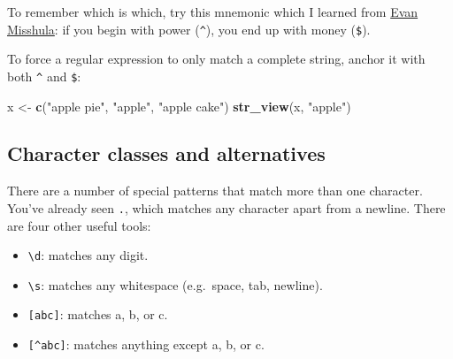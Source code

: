 \documentclass[]{book}
\newenvironment{Shaded}{\begin{snugshade}}{\end{snugshade}}
\newcommand{\KeywordTok}[1]{\textcolor[rgb]{0.13,0.29,0.53}{\textbf{#1}}}
\newcommand{\NormalTok}[1]{#1}
\newcommand{\StringTok}[1]{\textcolor[rgb]{0.31,0.60,0.02}{#1}}
\providecommand{\tightlist}{%
  \setlength{\itemsep}{0pt}\setlength{\parskip}{0pt}}
\begin{document}
\hypertarget{htmlwidget-10b3b7155e8045a1b2ad}{}

\begin{Shaded}
\end{Shaded}

\hypertarget{htmlwidget-4018eef1a407a0df6b52}{}

To remember which is which, try this mnemonic which I learned from \href{https://twitter.com/emisshula/status/323863393167613953}{Evan Misshula}: if you begin with power (\texttt{\^{}}), you end up with money (\texttt{\$}).

To force a regular expression to only match a complete string, anchor it with both \texttt{\^{}} and \texttt{\$}:

\begin{Shaded}
\begin{Highlighting}[]
\NormalTok{x <-}\StringTok{ }\KeywordTok{c}\NormalTok{(}\StringTok{"apple pie"}\NormalTok{, }\StringTok{"apple"}\NormalTok{, }\StringTok{"apple cake"}\NormalTok{)}
\KeywordTok{str_view}\NormalTok{(x, }\StringTok{"apple"}\NormalTok{)}
\end{Highlighting}
\end{Shaded}

\hypertarget{htmlwidget-5b1b2f4ad92281566982}{}

\begin{Shaded}
\end{Shaded}

\hypertarget{htmlwidget-25c3e940e6859592f801}{}

\hypertarget{character-classes-and-alternatives}{%
\subsection{Character classes and alternatives}\label{character-classes-and-alternatives}}

There are a number of special patterns that match more than one character. You've already seen \texttt{.}, which matches any character apart from a newline. There are four other useful tools:

\begin{itemize}
\tightlist
\item
  \texttt{\textbackslash{}d}: matches any digit.
\item
  \texttt{\textbackslash{}s}: matches any whitespace (e.g.~space, tab, newline).
\item
  \texttt{{[}abc{]}}: matches a, b, or c.
\item
  \texttt{{[}\^{}abc{]}}: matches anything except a, b, or c.
\end{itemize}
\end{document}
